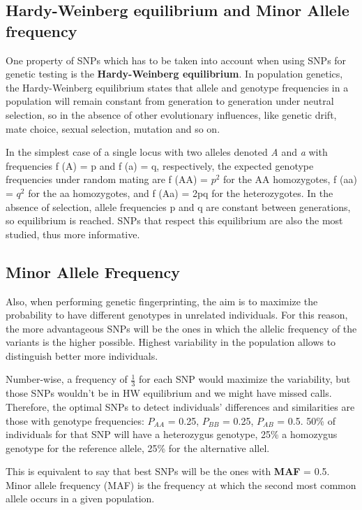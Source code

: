 \subsection{Hardy-Weinberg equilibrium and Minor Allele frequency}

One property of SNPs which has to be taken into account when using SNPs for genetic testing is the \textbf{Hardy-Weinberg equilibrium}. 
In population genetics, the Hardy-Weinberg equilibrium states that allele and genotype frequencies in a population will remain constant from generation to generation under neutral selection, so in the absence of other evolutionary influences, like genetic drift, mate choice, sexual selection, mutation and so on.

In the simplest case of a single locus with two alleles denoted \emph{A} and \emph{a} with frequencies f (A) = p and f (a) = q, respectively, the expected genotype frequencies under random mating are f (AA) = $p^{2}$ for the AA homozygotes, f (aa) = $q^{2}$ for the aa homozygotes, and f (Aa) = 2pq for the heterozygotes. In the absence of selection, allele frequencies p and q are constant between generations, so equilibrium is reached.
SNPs that respect this equilibrium are also the most studied, thus more informative. 

\subsection{Minor Allele Frequency}

Also, when performing genetic fingerprinting, the aim is to maximize the probability to have different genotypes in unrelated individuals. 
For this reason, the more advantageous SNPs will be the ones in which the allelic frequency of the variants is the higher possible. Highest variability in the population allows to distinguish better more individuals. 

Number-wise, a frequency of $\frac{1}{3}$ for each SNP would maximize the variability, but those SNPs wouldn't be in HW equilibrium and we might have missed calls. 
Therefore, the optimal SNPs to detect individuals’ differences and similarities are those with genotype frequencies: $P_{AA}$ = 0.25, $P_{BB}$ = 0.25, $P_{AB}$ = 0.5. 50\% of individuals for that SNP will have a heterozygus genotype, 25\% a homozygus genotype for the reference allele, 25\% for the alternative allel.

This is equivalent to say that best SNPs will be the ones with \textbf{MAF} = 0.5. Minor allele frequency (MAF) is the frequency at which the second most common allele occurs in a given population.

